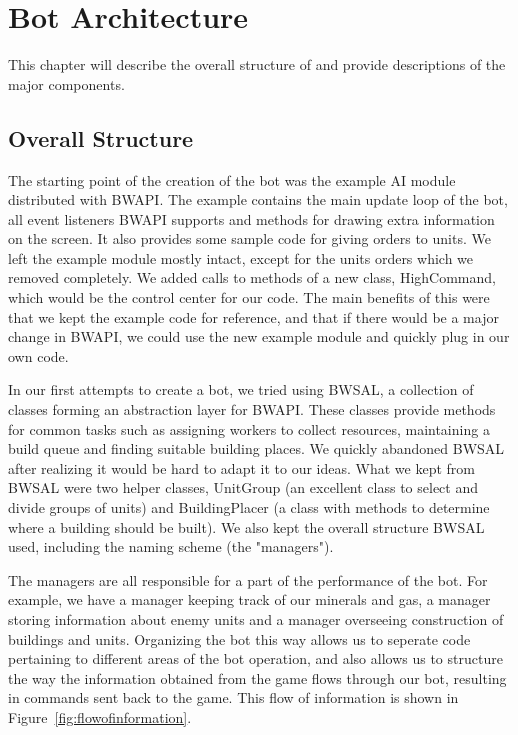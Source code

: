 
\chapter{Bot Architecture}

This chapter will describe the overall structure of \massexpand and provide descriptions of the major components.

\section{Overall Structure}

The starting point of the creation of the bot was the example AI module distributed with BWAPI. The example contains the main update loop of the bot, all event listeners BWAPI supports and methods for drawing extra information on the screen. It also provides some sample code for giving orders to units. We left the example module mostly intact, except for the units orders which we removed completely. We added calls to methods of a new class, HighCommand, which would be the control center for our code. The main benefits of this were that we kept the example code for reference, and that if there would be a major change in BWAPI, we could use the new example module and quickly plug in our own code.

In our first attempts to create a bot, we tried using BWSAL, a collection of classes forming an abstraction layer for BWAPI. These classes provide methods for common tasks such as assigning workers to collect resources, maintaining a build queue and finding suitable building places. We quickly abandoned BWSAL after realizing it would be hard to adapt it to our ideas. What we kept from BWSAL were two helper classes, UnitGroup (an excellent class to select and divide groups of units) and BuildingPlacer (a class with methods to determine where a building should be built). We also kept the overall structure BWSAL used, including the naming scheme (the "managers").

The managers are all responsible for a part of the performance of the bot. For example, we have a manager keeping track of our minerals and gas, a manager storing information about enemy units and a manager overseeing construction of buildings and units. Organizing the bot this way allows us to seperate code pertaining to different areas of the bot operation, and also allows us to structure the way the information obtained from the game flows through our bot, resulting in commands sent back to the game. This flow of information is shown in Figure~\ref{fig:flowofinformation}.

